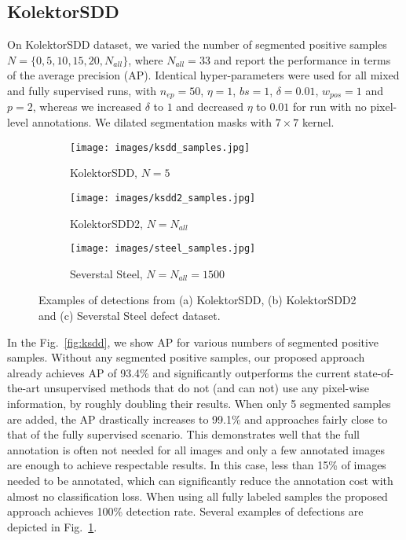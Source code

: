 \subsection{KolektorSDD}
On KolektorSDD dataset, we varied the number of segmented positive samples $N = \{0, 5, 10, 15, 20, N_{all}\}$, where $N_{all}=33$ and report the performance in terms of the average precision (AP). Identical hyper-parameters were used for all mixed and fully supervised runs, with $n_{ep}=50$, $\eta=1$, $bs=1$, $\delta=0.01$, $w_{pos}=1$ and $p=2$, whereas we increased $\delta$ to $1$ and decreased $\eta$ to $0.01$ for run with no pixel-level annotations. We dilated segmentation masks with $7\times7$ kernel.  

\begin{figure}
\centering

\begin{subfigure}[b]{\columnwidth}
   \texttt{[image: images/ksdd\_samples.jpg]}
   \caption{KolektorSDD, $N=5$}
   \label{fig:samples_ksdd}
\end{subfigure}

\begin{subfigure}[b]{\columnwidth}
   \texttt{[image: images/ksdd2\_samples.jpg]}
   \caption{KolektorSDD2, $N=N_{all}$}
   \label{fig:samples_ksdd2}
\end{subfigure}

\begin{subfigure}[b]{\columnwidth}
   \texttt{[image: images/steel\_samples.jpg]}
   \caption{Severstal Steel, $N=N_{all}=1500$}
   \label{fig:samples_steel} 
\end{subfigure}
\caption{Examples of detections from (a) KolektorSDD, (b) KolektorSDD2 and (c) Severstal Steel defect dataset.}
\label{fig:samples_all} 
\end{figure}

In the Fig.~\ref{fig:ksdd}, we show AP for various numbers of segmented positive samples. Without any segmented positive samples, our proposed approach already achieves AP of 93.4\% and significantly outperforms the current state-of-the-art unsupervised methods that do not (and can not) use any pixel-wise information, by roughly doubling their results. 
When only 5 segmented samples are added, the AP drastically increases to 99.1\% and approaches fairly close to that of the fully supervised scenario. This demonstrates well that the full annotation is often not needed for all images and only a few annotated images are enough to achieve respectable results. In this case, less than 15\% of images needed to be annotated, which can significantly reduce the annotation cost with almost no classification loss. When using all fully labeled samples the proposed approach achieves 100\% detection rate.
Several examples of defections are depicted in Fig.~\ref{fig:samples_ksdd}.

